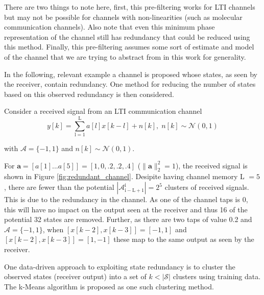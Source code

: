 \documentclass[12pt,a4paper]{report}
\begin{document}
There are two things to note here, first, this pre-filtering works for LTI channels but may not be possible for channels with non-linearities (such as molecular communication channels). Also note that even this minimum phase representation of the channel still has redundancy that could be reduced using this method. Finally, this pre-filtering assumes some sort of estimate and model of the channel that we are trying to abstract from in this work for generality. 


In the following, relevant example a channel is proposed whose states, as seen by the receiver, contain redundancy. One method for reducing the number of states based on this observed redundancy is then considered. 

Consider a received signal from an LTI communication channel
\begin{equation*}
y[k] = \sum_{\mathrm{l=1}}^{\mathrm{L}} a[l]x[k-l] + n[k], \; n[k]  \sim \mathcal{N}(0,1)
\end{equation*}

with  $\mathcal{A}=\{-1, 1\}$ and $n[k]  \sim \mathcal{N}(0,1)$.  

For $\mathbf{a} = [a[1]...a[5]]=[1, 0, .2, .2, .4]$ ($\|\mathbf{a}\|^2_2 = 1$), the received signal is shown in Figure \ref{fig:redundant_channel}. Desipite having channel memory L $=5$, there are fewer than the potential $|\mathcal{A}_{\mathrm{i-L+1}}^{\mathrm{i}}| =2^5$ clusters of received signals. This is due to the redundancy in the channel.  As one of the channel taps is 0, this will have no impact on the output seen at the receiver and thus 16 of the potential 32 states are removed. Further, as there are two taps of value 0.2 and $\mathcal{A}=\{-1, 1\}$, when $\left[x[k-2],x[k-3]\right] = [-1,1]$ and $\left[x[k-2],x[k-3]\right] = [1,-1]$ these map to the same output as seen by the receiver. 


\par
One data-driven approach to exploiting state redundancy is to cluster the observed states (receiver output) into a set of $k<|\mathcal{S}|$ clusters using training data. The k-Means algorithm is proposed as one such clustering method.
\\
\end{document}
